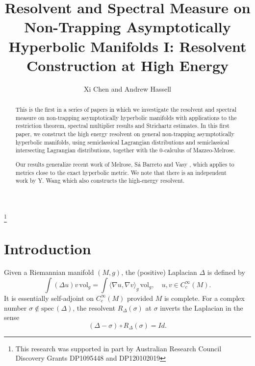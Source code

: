 \documentclass[10pt, a4paper, twoside]{amsart}
\numberwithin{equation}{section}
\theoremstyle{remark}
\begin{document}
\title{\textbf{Resolvent and Spectral Measure on Non-Trapping Asymptotically Hyperbolic Manifolds I: 
Resolvent Construction at High Energy}}


\thanks{This research was supported in part by Australian Research Council Discovery Grants DP1095448 and DP120102019}

\author{Xi Chen and Andrew Hassell}

\begin{abstract} This is the first in a series of papers in which we investigate the resolvent and spectral measure on non-trapping asymptotically hyperbolic manifolds with applications to the restriction theorem, spectral multiplier results and Strichartz estimates. In this first paper, we construct the high energy resolvent on general non-trapping asymptotically hyperbolic manifolds, using  semiclassical Lagrangian distributions and semiclassical intersecting Lagrangian distributions, together with the $0$-calculus of Mazzeo-Melrose.

Our results generalize recent work of Melrose, S\'{a} Barreto and Vasy \cite{Melrose-Sa Barreto-Vasy}, which applies to metrics close to the exact hyperbolic metric.  
We note that there is an independent work by Y. Wang \cite{Wang} which also constructs the high-energy resolvent.  \end{abstract}

\maketitle

\section{Introduction}

Given a Riemannian manifold $(M, g)$, the (positive) Laplacian $\Delta$ is defined by  $$\int (\Delta u) v \,  \text{vol}_g = \int \langle \nabla u,  \nabla v \rangle_g  \,  \text{vol}_g, \quad u, v \in C_c^\infty(M). $$ It is essentially self-adjoint on $C_c^\infty(M)$ provided $M$ is complete. 
For a complex number $\sigma \notin \text{spec}\,(\Delta)$, the resolvent $R_\Delta(\sigma)$ at $\sigma$  inverts the Laplacian in the sense $$(\Delta - \sigma) \circ R_\Delta(\sigma) = Id.$$
\end{document}
